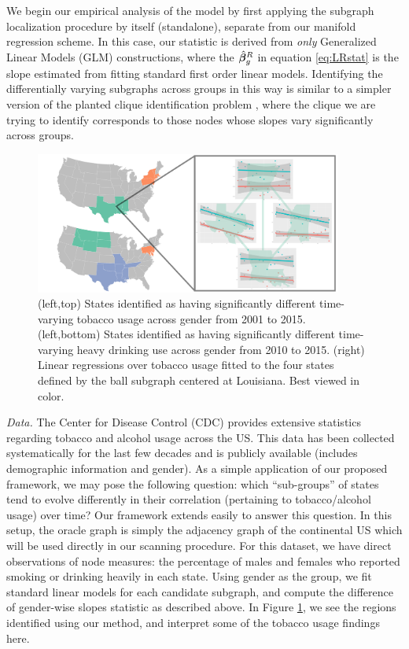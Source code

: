 We begin our empirical analysis of the model by first applying the subgraph localization procedure by itself (standalone), separate from our manifold regression scheme. In this case, our statistic is derived from {\em only} Generalized Linear Models (GLM) constructions, where the $\hat{\bm{\beta}}_g^R$ in equation \eqref{eq:LRstat} is the slope estimated from fitting standard first order linear models. Identifying the differentially varying subgraphs across groups in this way is similar to a simpler version of the planted clique identification problem \citep{arora2009computational}, where the clique we are trying to identify corresponds to those nodes whose slopes vary significantly across groups.
\begin{figure}
	\begin{center}
		\includegraphics[trim={0cm 0cm 0cm 0cm}, clip, width=0.9\textwidth]{3_covtraj/figs/tobacco_zoom.pdf}
	\end{center}
	\caption[Tobacco use state relationships via covariance trajectory analysis]{(left,top) States identified as having significantly different time-varying tobacco usage across gender from 2001 to 2015. (left,bottom) States identified as having significantly different time-varying heavy drinking use across gender from 2010 to 2015. (right) Linear regressions over tobacco usage fitted to the four states defined by the ball subgraph centered at Louisiana. Best viewed in color.}
	\label{fig:tobalc}
\end{figure}

{\em Data.} The Center for Disease Control (CDC) provides extensive statistics regarding tobacco and alcohol usage across the US. This data has been collected systematically for the last few decades and is publicly available (includes demographic information and gender). As a simple application of our 
proposed framework, 
we may pose the following question: which ``sub-groups'' of states tend to evolve differently in their correlation (pertaining to tobacco/alcohol usage) over time? 
Our framework extends easily to answer this question. In this setup, the oracle graph is simply the adjacency graph of the continental
US which will be used directly in our scanning procedure.
For this dataset, we have direct observations of node measures: the percentage of males and females who 
reported smoking or drinking heavily in each state. Using 
gender as the group, 
we fit standard linear models for each candidate subgraph, and compute the difference of gender-wise 
slopes statistic as described above. 
In Figure \ref{fig:tobalc}, we see the regions identified using our method, and interpret some of the tobacco usage findings here.

